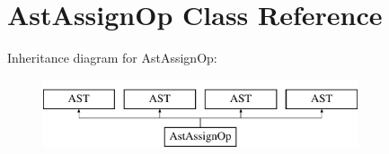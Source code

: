 \hypertarget{classAstAssignOp}{\section{Ast\-Assign\-Op Class Reference}
\label{classAstAssignOp}
}
Inheritance diagram for Ast\-Assign\-Op\-:\begin{figure}[H]
\begin{center}
\leavevmode
\includegraphics[height=2.000000cm]{classAstAssignOp}
\end{center}
\end{figure}
